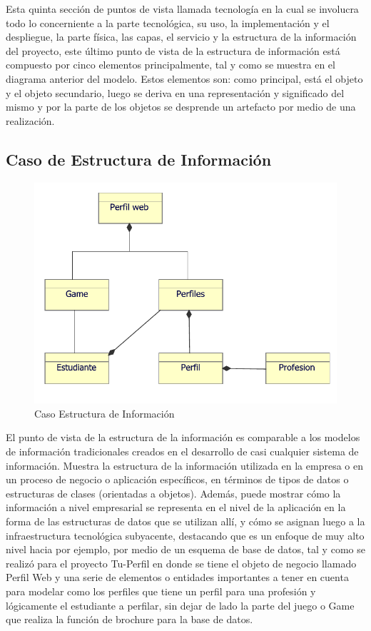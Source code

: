 Esta quinta sección de puntos de vista llamada tecnología en la cual se involucra todo lo concerniente a la parte tecnológica, su uso, la implementación y el despliegue, la parte física, las capas, el servicio y la estructura de la información del proyecto, este último punto de vista de la estructura de información está compuesto por cinco elementos principalmente, tal y como se muestra en el diagrama anterior del modelo. Estos elementos son: como principal, está el objeto y el objeto secundario, luego se deriva en una representación y significado del mismo y por la parte de los objetos se desprende un artefacto por medio de una realización. 


\subsection{Caso  de Estructura de Información}
\begin{figure}[h!]
	\centering
	\includegraphics[width=.8\linewidth]{imgs/caso/estructuraInformaci}
	\caption{Caso Estructura de Información}
\end{figure}

El punto de vista de la estructura de la información es comparable a los modelos de información tradicionales creados en el desarrollo de casi cualquier sistema de información. Muestra la estructura de la información utilizada en la empresa o en un proceso de negocio o aplicación específicos, en términos de tipos de datos o estructuras de clases (orientadas a objetos). Además, puede mostrar cómo la información a nivel empresarial se representa en el nivel de la aplicación en la forma de las estructuras de datos que se utilizan allí, y cómo se asignan luego a la infraestructura tecnológica subyacente, destacando que es un enfoque de muy alto nivel hacia por ejemplo, por medio de un esquema de base de datos, tal y como se realizó para el proyecto Tu-Perfil en donde se tiene el objeto de negocio llamado Perfil Web y una serie de elementos o entidades importantes a tener en cuenta para modelar como los perfiles que tiene un perfil para una profesión y lógicamente el estudiante a perfilar, sin dejar de lado la parte del juego o Game que realiza la función de brochure para la base de datos.

\clearpage